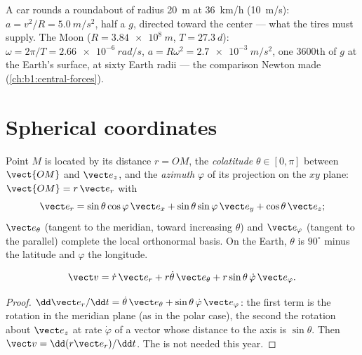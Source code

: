 \begin{example}\label{ex:b1:point-kinematics:circles}
A car rounds a roundabout of radius \qty{20}{m} at \qty{36}{km/h}
(\qty{10}{m/s}): $a = v^2/R = \qty{5.0}{m/s^2}$, half a $g$, directed
toward the center --- what the tires must supply. The Moon
($R = \qty{3.84e8}{m}$, $T = \qty{27.3}{d}$): $\omega = 2\pi/T =
\qty{2.66e-6}{rad/s}$, $a = R\omega^2 = \qty{2.7e-3}{m/s^2}$, one
$3600$th of $g$ at the Earth's surface, at sixty Earth radii --- the
comparison Newton made (\cref{ch:b1:central-forces}).
\end{example}

\section{Spherical coordinates}

\begin{definition}\label{def:b1:point-kinematics:spherical}
Point $M$ is located by its distance $r = OM$, the \emph{colatitude}
$\theta \in [0, \pi]$ between $\vect{OM}$ and $\vect e_z$, and the
\emph{azimuth} $\varphi$ of its projection on the $xy$ plane:
$\vect{OM} = r\,\vect e_r$ with
\[
\vect e_r = \sin\theta\cos\varphi\,\vect e_x + \sin\theta\sin\varphi\,\vect e_y + \cos\theta\,\vect e_z ;
\]
$\vect e_\theta$ (tangent to the meridian, toward increasing $\theta$)
and $\vect e_\varphi$ (tangent to the parallel) complete the local
orthonormal basis. On the Earth, $\theta$ is $90^\circ$ minus the
latitude and $\varphi$ the longitude.
\end{definition}

\begin{proposition}\label{prop:b1:point-kinematics:sphericalv}
\[
\vect v = \dot r\,\vect e_r + r\dot\theta\,\vect e_\theta + r\sin\theta\,\dot\varphi\,\vect e_\varphi .
\]
\end{proposition}

\begin{proof}
$\dd\vect e_r/\dd t = \dot\theta\,\vect e_\theta + \sin\theta\,\dot\varphi\,
\vect e_\varphi$: the first term is the rotation in the meridian plane
(as in the polar case), the second the rotation about $\vect e_z$ at
rate $\dot\varphi$ of a vector whose distance to the axis is
$\sin\theta$. Then $\vect v = \dd(r\vect e_r)/\dd t$. The  is
not needed this year.
\end{proof}

